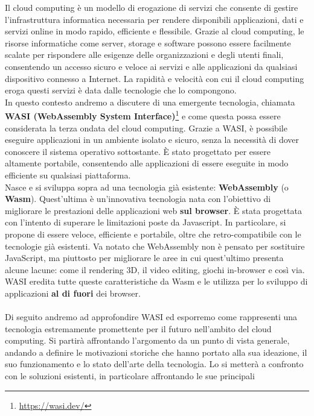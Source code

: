 Il cloud computing è un modello di erogazione di servizi che consente di gestire l'infrastruttura informatica necessaria
per rendere disponibili applicazioni, dati e servizi online in modo rapido, efficiente e flessibile. Grazie al cloud
computing, le risorse informatiche come server, storage e software possono essere facilmente scalate per rispondere alle
esigenze delle organizzazioni e degli utenti finali, consentendo un accesso sicuro e veloce ai servizi e alle
applicazioni da qualsiasi dispositivo connesso a Internet. La rapidità e velocità con cui il cloud computing eroga
questi servizi è data dalle tecnologie che lo compongono. \\
In questo contesto andremo a discutere di una emergente tecnologia, chiamata \textbf{WASI (WebAssembly System
Interface)}\footnote{\url{https://wasi.dev/}} e come questa possa essere considerata la terza ondata del cloud
computing\cite{cloudcomputing-thirdwave}. Grazie a WASI, è possibile eseguire applicazioni in un ambiente isolato e
sicuro, senza la necessità di dover conoscere il sistema operativo sottostante. È stato progettato per essere altamente
portabile, consentendo alle applicazioni di essere eseguite in modo efficiente su qualsiasi piattaforma. \\
Nasce e si sviluppa sopra ad una tecnologia già esistente: \textbf{WebAssembly} (o \textbf{Wasm}). Quest'ultima è
un'innovativa tecnologia nata con l'obiettivo di migliorare le prestazioni delle applicazioni web \textbf{sul browser}.
È stata progettata con l'intento di superare le limitazioni poste da Javascript. In particolare, si propone di essere
veloce, efficiente e portabile, oltre che retro-compatibile con le tecnologie già esistenti. Va notato che WebAssembly
non è pensato per sostituire JavaScript, ma piuttosto per migliorare le aree in cui quest'ultimo presenta alcune lacune:
come il rendering 3D, il video editing, giochi in-browser e così via. \\
WASI eredita tutte queste caratteristiche da Wasm e le utilizza per lo sviluppo di applicazioni \textbf{al di fuori} dei
browser. \\\\
Di seguito andremo ad approfondire WASI ed esporremo come rappresenti una tecnologia estremamente promettente per il
futuro nell'ambito del cloud computing. Si partirà affrontando l'argomento da un punto di vista generale, andando a
definire le motivazioni storiche che hanno portato alla sua ideazione, il suo funzionamento e lo stato dell'arte della
tecnologia. Lo si metterà a confronto con le soluzioni esistenti, in particolare affrontando le sue principali
